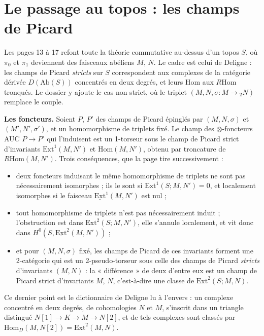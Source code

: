 \documentclass[11pt,a4paper]{article}
\begin{document}
\section*{Le passage au topos : les champs de Picard}

Les pages 13 à 17 refont toute la théorie commutative au-dessus d'un topos
$S$, où $\pi_{0}$ et $\pi_{1}$ deviennent des faisceaux abéliens $M$, $N$. Le
cadre est celui de Deligne : les champs de Picard \emph{stricts} sur $S$
correspondent aux complexes de la catégorie dérivée $D(\mathrm{Ab}(S))$
concentrés en deux degrés, et leurs $\mathrm{Hom}$ aux $R\mathrm{Hom}$
tronqués. Le dossier y ajoute le cas non strict, où le triplet
$(M, N, \sigma : M \to {}_{2}N)$ remplace le couple.

\textbf{Les foncteurs.} Soient $P$, $P'$ des champs de Picard épinglés par
$(M,N,\sigma)$ et $(M',N',\sigma')$, et un homomorphisme de triplets fixé.
Le champ des $\otimes$-foncteurs AUC $P \to P'$ qui l'induisent est un
1-torseur sous le champ de Picard strict d'invariants $\mathrm{Ext}^{1}(M,N')$
et $\mathrm{Hom}(M,N')$, obtenu par troncature de $R\mathrm{Hom}(M,N')$.
Trois conséquences, que la page tire successivement :

\begin{itemize}
\item deux foncteurs induisant le même homomorphisme de triplets ne sont pas
nécessairement isomorphes ; ils le sont si $\mathrm{Ext}^{1}(S; M,N') = 0$, et
localement isomorphes si le faisceau $\underline{\mathrm{Ext}}^{1}(M,N')$ est
nul ;
\item tout homomorphisme de triplets n'est pas nécessairement induit ;
l'obstruction est dans $\mathrm{Ext}^{2}(S; M,N')$, elle s'annule localement,
et vit donc dans $H^{0}(S, \underline{\mathrm{Ext}}^{2}(M,N'))$ ;
\item et pour $(M,N,\sigma)$ fixé, les champs de Picard de ces invariants
forment une 2-catégorie qui est un 2-pseudo-torseur sous celle des champs de
Picard \emph{stricts} d'invariants $(M,N)$ : la « différence » de deux d'entre
eux est un champ de Picard strict d'invariants $M$, $N$, c'est-à-dire une
classe de $\mathrm{Ext}^{2}(S; M,N)$.
\end{itemize}

Ce dernier point est le dictionnaire de Deligne lu à l'envers : un
complexe concentré en deux degrés, de cohomologies $N$ et $M$, s'inscrit dans
un triangle distingué $N[1] \to K \to M \to N[2]$, et de tels complexes sont
classés par $\mathrm{Hom}_{D}(M, N[2]) = \mathrm{Ext}^{2}(M,N)$.
\end{document}
